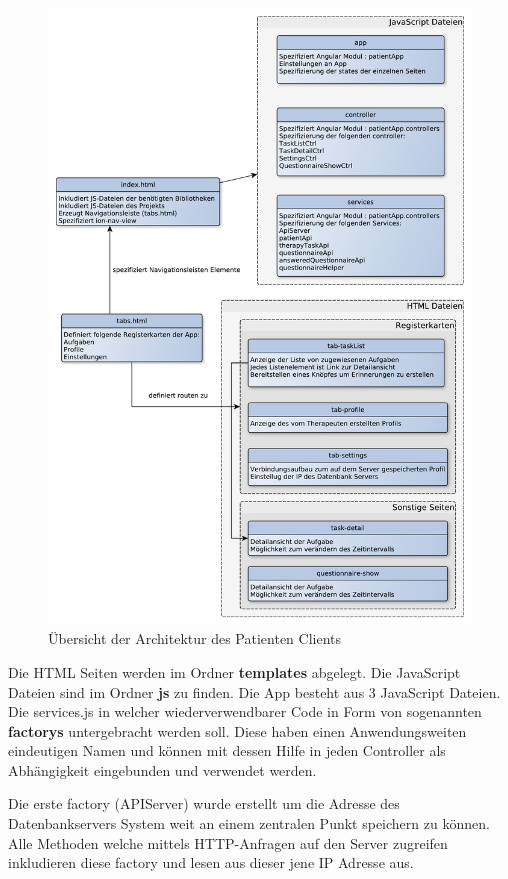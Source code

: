 \begin{figure}[H]
	\centering
	\includegraphics[scale=0.52]{images/PatientenClientArchitektur}
	\caption[Übersicht der Architektur des Patienten Clients]{Übersicht der Architektur des Patienten Clients}
	\label{PatientenClientArchitektur}
\end{figure}

Die HTML Seiten werden im Ordner \textbf{templates} abgelegt. Die JavaScript Dateien sind im Ordner \textbf{js} zu finden. Die App besteht aus 3 JavaScript Dateien. Die services.js in welcher wiederverwendbarer Code in Form von sogenannten \textbf{factorys} untergebracht werden soll. Diese haben einen Anwendungsweiten eindeutigen Namen und können mit dessen Hilfe in jeden Controller als Abhängigkeit eingebunden und verwendet werden.

Die erste factory (APIServer) wurde erstellt um die Adresse des Datenbankservers System weit an einem zentralen Punkt speichern zu können. Alle Methoden welche mittels HTTP-Anfragen auf den Server zugreifen inkludieren diese factory und lesen aus dieser jene IP Adresse aus.

